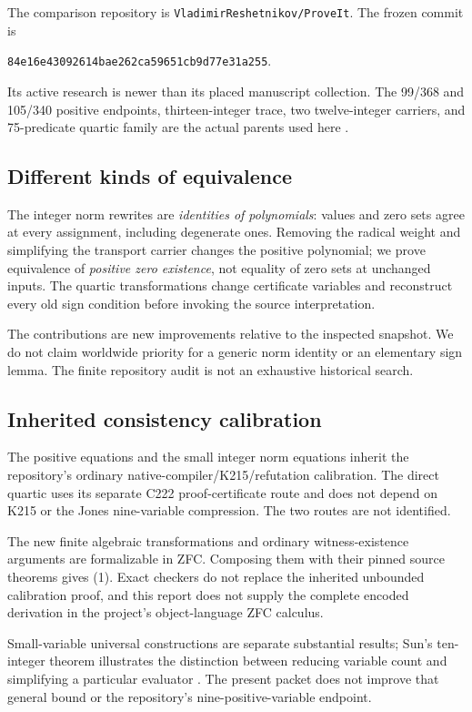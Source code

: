 \documentclass[11pt]{article}
\theoremstyle{remark}
\newcommand{\sha}{\texttt{84e16e43092614bae262ca59651cb9d77e31a255}}
\begin{document}
The comparison repository is \texttt{VladimirReshetnikov/ProveIt}.
The frozen commit is
\begin{center}\small\sha.\end{center}
Its active research is newer than its placed manuscript
collection. The 99/368 and 105/340 positive endpoints, thirteen-integer
trace, two twelve-integer carriers, and 75-predicate quartic family are
the actual parents used here \cite{zero,direct,trace,scalar,quartic75}.

\subsection{Different kinds of equivalence}

The integer norm rewrites are \emph{identities of polynomials}: values and
zero sets agree at every assignment, including degenerate ones.
Removing the radical weight and simplifying the transport carrier changes
the positive polynomial; we prove equivalence of \emph{positive zero
existence}, not equality of zero sets at unchanged inputs.
The quartic transformations change certificate variables and reconstruct
every old sign condition before invoking the source interpretation.

The contributions are new improvements relative to the inspected
snapshot. We do not claim worldwide priority for a generic norm identity
or an elementary sign lemma. The finite repository audit is not an
exhaustive historical search.

\subsection{Inherited consistency calibration}

The positive equations and the small integer norm equations inherit the
repository's ordinary native-compiler/K215/refutation calibration.
The direct quartic uses its separate C222 proof-certificate route and
does not depend on K215 or the Jones nine-variable compression.
The two routes are not identified.

The new finite algebraic transformations and ordinary witness-existence
arguments are formalizable in ZFC. Composing them with their pinned
source theorems gives (1). Exact checkers do not replace the inherited
unbounded calibration proof, and this report does not supply the complete
encoded derivation in the project's object-language ZFC calculus.

Small-variable universal constructions are separate substantial results;
Sun's ten-integer theorem illustrates the distinction between reducing
variable count and simplifying a particular evaluator \cite{sun}.
The present packet does not improve that general bound or the repository's
nine-positive-variable endpoint.
\end{document}
